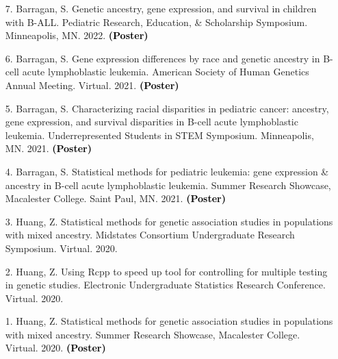 \documentclass[margin]{res}
\newcommand{\annotate}[1]{\textcolor{black}{\textbf{(#1)}}}
\begin{document}
\begin{resume}
\begin{itemize}
\item[7.] Barragan, S.  
Genetic ancestry, gene expression, and survival in children with B-ALL. 
Pediatric Research, Education, \& Scholarship Symposium. Minneapolis, MN. 2022. 
\annotate{Poster}


\item[6.] Barragan, S.  
Gene expression differences by race and genetic ancestry in B-cell acute lymphoblastic leukemia. 
American Society of Human Genetics Annual Meeting. Virtual. 2021. 
\annotate{Poster}

\item[5.] Barragan, S.  
Characterizing racial disparities in pediatric cancer: ancestry, gene expression, and survival disparities in B-cell acute lymphoblastic leukemia. 
Underrepresented Students in STEM Symposium. Minneapolis, MN. 2021. 
\annotate{Poster}

\item[4.] Barragan, S.  
Statistical methods for pediatric leukemia: gene expression \& ancestry in B-cell acute lymphoblastic leukemia. 
Summer Research Showcase, Macalester College. Saint Paul, MN. 2021. 
\annotate{Poster}


\item[3.] Huang, Z. 
Statistical methods for genetic association studies in populations with mixed ancestry. 
Midstates Consortium Undergraduate Research Symposium. Virtual. 2020.

\item[2.] Huang, Z. 
Using Rcpp to speed up tool for controlling for multiple testing in genetic studies. 
Electronic Undergraduate Statistics Research Conference. Virtual. 2020.

\item[1.] Huang, Z. 
Statistical methods for genetic association studies in populations with mixed ancestry. 
Summer Research Showcase, Macalester College. Virtual. 2020. 
\annotate{Poster} \\

\end{itemize}




\end{resume}
\end{document}
